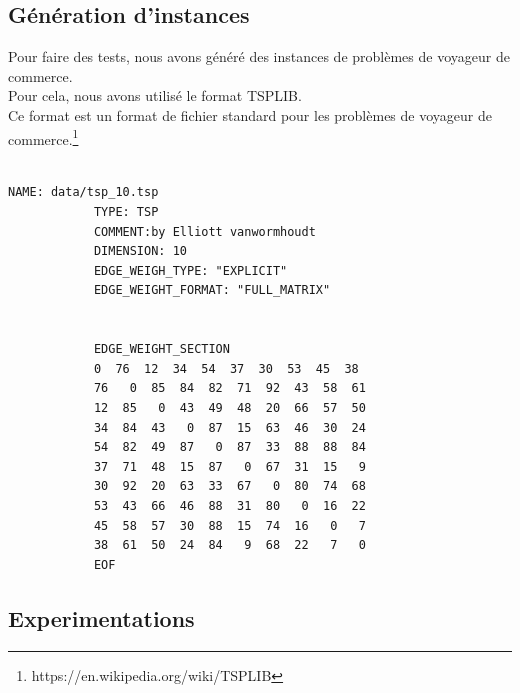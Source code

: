 \documentclass{article}
\begin{document}
        \subsection{Génération d'instances}\label{subsec:generation-d'instances}
        Pour faire des tests, nous avons généré des instances de problèmes de voyageur de commerce.\\
        Pour cela, nous avons utilisé le format TSPLIB.\\
        Ce format est un format de fichier standard pour les problèmes de voyageur de commerce.\footnote{https://en.wikipedia.org/wiki/TSPLIB}\\\\
        \begin{lstlisting}[label={lst:tsplib}]
            NAME: data/tsp_10.tsp
            TYPE: TSP
            COMMENT:by Elliott vanwormhoudt
            DIMENSION: 10
            EDGE_WEIGH_TYPE: "EXPLICIT"
            EDGE_WEIGHT_FORMAT: "FULL_MATRIX"


            EDGE_WEIGHT_SECTION
            0  76  12  34  54  37  30  53  45  38
            76   0  85  84  82  71  92  43  58  61
            12  85   0  43  49  48  20  66  57  50
            34  84  43   0  87  15  63  46  30  24
            54  82  49  87   0  87  33  88  88  84
            37  71  48  15  87   0  67  31  15   9
            30  92  20  63  33  67   0  80  74  68
            53  43  66  46  88  31  80   0  16  22
            45  58  57  30  88  15  74  16   0   7
            38  61  50  24  84   9  68  22   7   0
            EOF
        \end{lstlisting}


        \subsection{Experimentations}\label{subsec:experimentations}
\end{document}
